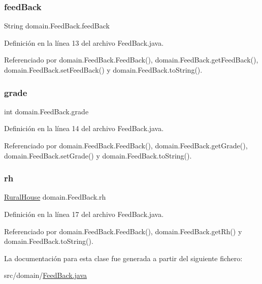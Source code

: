 \subsubsection{\texorpdfstring{feedBack}{feedBack}}
{\footnotesize\ttfamily String domain.\+Feed\+Back.\+feed\+Back\hspace{0.3cm}{\ttfamily [private]}}



Definición en la línea 13 del archivo Feed\+Back.\+java.



Referenciado por domain.\+Feed\+Back.\+Feed\+Back(), domain.\+Feed\+Back.\+get\+Feed\+Back(), domain.\+Feed\+Back.\+set\+Feed\+Back() y domain.\+Feed\+Back.\+to\+String().

\mbox{\label{classdomain_1_1_feed_back_a979ed82b8bc6c40e8447a88f84321751}} 
\subsubsection{\texorpdfstring{grade}{grade}}
{\footnotesize\ttfamily int domain.\+Feed\+Back.\+grade\hspace{0.3cm}{\ttfamily [private]}}



Definición en la línea 14 del archivo Feed\+Back.\+java.



Referenciado por domain.\+Feed\+Back.\+Feed\+Back(), domain.\+Feed\+Back.\+get\+Grade(), domain.\+Feed\+Back.\+set\+Grade() y domain.\+Feed\+Back.\+to\+String().

\mbox{\label{classdomain_1_1_feed_back_a4ec8b55bbf07e1a8e5bd00c0a27e13a3}} 
\subsubsection{\texorpdfstring{rh}{rh}}
{\footnotesize\ttfamily \mbox{\hyperlink{classdomain_1_1_rural_house}{Rural\+House}} domain.\+Feed\+Back.\+rh\hspace{0.3cm}{\ttfamily [private]}}



Definición en la línea 17 del archivo Feed\+Back.\+java.



Referenciado por domain.\+Feed\+Back.\+Feed\+Back(), domain.\+Feed\+Back.\+get\+Rh() y domain.\+Feed\+Back.\+to\+String().



La documentación para esta clase fue generada a partir del siguiente fichero\+:\begin{DoxyCompactItemize}
\item 
src/domain/\mbox{\hyperlink{_feed_back_8java}{Feed\+Back.\+java}}\end{DoxyCompactItemize}
